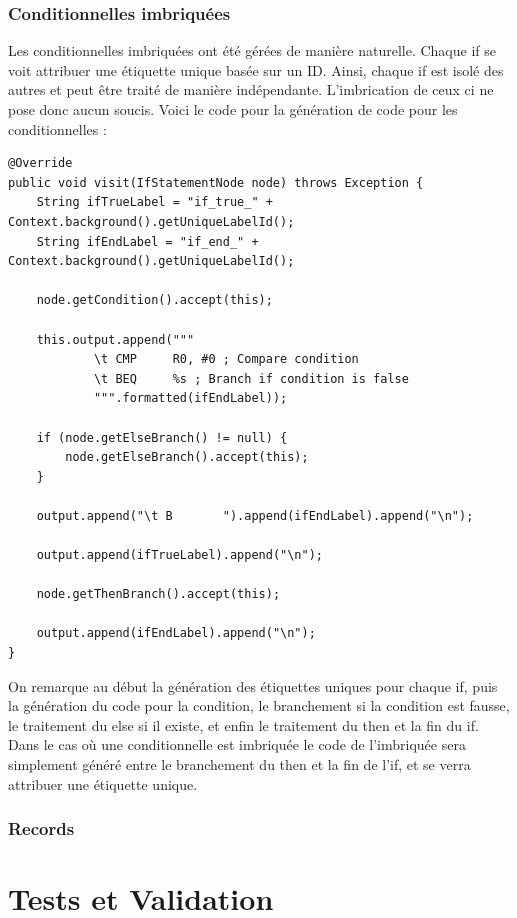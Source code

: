 \documentclass[french,a4paper]{article}
\begin{document}
    \subsubsection{Conditionnelles imbriquées}

    Les conditionnelles imbriquées ont été gérées de manière naturelle. Chaque if se voit attribuer une étiquette unique basée sur un ID. Ainsi, chaque if est isolé des autres et peut être traité de manière indépendante. L'imbrication de ceux ci ne pose donc aucun soucis. Voici le code pour la génération de code pour les conditionnelles :

    \begin{lstlisting}
@Override
public void visit(IfStatementNode node) throws Exception {
    String ifTrueLabel = "if_true_" + Context.background().getUniqueLabelId();
    String ifEndLabel = "if_end_" + Context.background().getUniqueLabelId();

    node.getCondition().accept(this);

    this.output.append("""
            \t CMP     R0, #0 ; Compare condition
            \t BEQ     %s ; Branch if condition is false
            """.formatted(ifEndLabel));

    if (node.getElseBranch() != null) {
        node.getElseBranch().accept(this);
    }

    output.append("\t B       ").append(ifEndLabel).append("\n");

    output.append(ifTrueLabel).append("\n");

    node.getThenBranch().accept(this);

    output.append(ifEndLabel).append("\n");
}
    \end{lstlisting}

    On remarque au début la génération des étiquettes uniques pour chaque if, puis la génération du code pour la condition, le branchement si la condition est fausse, le traitement du else si il existe, et enfin le traitement du then et la fin du if. Dans le cas où une conditionnelle est imbriquée le code de l'imbriquée sera simplement généré entre le branchement du then et la fin de l'if, et se verra attribuer une étiquette unique.

    \subsubsection{Records}


    \section{Tests et Validation}\label{sec:tests-et-validation}
\end{document}
